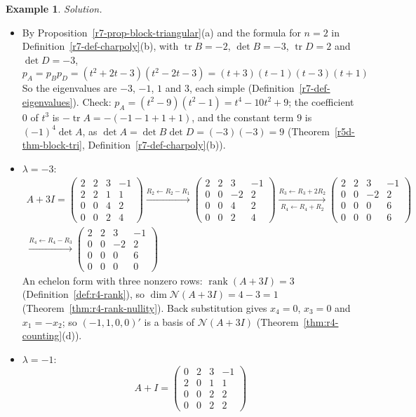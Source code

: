 \documentclass[12pt]{article}
\DeclareMathOperator{\tr}{tr}
\DeclareMathOperator{\rank}{rank}
\theoremstyle{definition}
\newtheorem{example}[theorem]{Example}
\begin{document}
\begin{example}
\textit{Solution.}
\begin{itemize}
\item By Proposition~\ref{r7-prop-block-triangular}(a) and the formula for \(n=2\) in
Definition~\ref{r7-def-charpoly}(b), with \(\tr B=-2\), \(\det B=-3\), \(\tr D=2\) and \(\det D=-3\),
\[
p_A=p_Bp_D=(t^2+2t-3)(t^2-2t-3)=(t+3)(t-1)(t-3)(t+1)
\]
So the eigenvalues are \(-3\), \(-1\), \(1\) and \(3\), each simple (Definition~\ref{r7-def-eigenvalues}). Check:
\(p_A=(t^2-9)(t^2-1)=t^4-10t^2+9\); the coefficient \(0\) of \(t^3\) is \(-\tr A=-(-1-1+1+1)\), and the constant term
\(9\) is \((-1)^4\det A\), as \(\det A=\det B\det D=(-3)(-3)=9\) (Theorem~\ref{r5d-thm-block-tri},
Definition~\ref{r7-def-charpoly}(b)).
\item \(\lambda=-3\):
\[
\begin{gathered}
A+3I=\begin{pmatrix}2&2&3&-1\\2&2&1&1\\0&0&4&2\\0&0&2&4\end{pmatrix}
\xrightarrow{R_2\leftarrow R_2-R_1}
\begin{pmatrix}2&2&3&-1\\0&0&-2&2\\0&0&4&2\\0&0&2&4\end{pmatrix}
\xrightarrow[R_4\leftarrow R_4+R_2]{R_3\leftarrow R_3+2R_2}
\begin{pmatrix}2&2&3&-1\\0&0&-2&2\\0&0&0&6\\0&0&0&6\end{pmatrix}
\\
\xrightarrow{R_4\leftarrow R_4-R_3}
\begin{pmatrix}2&2&3&-1\\0&0&-2&2\\0&0&0&6\\0&0&0&0\end{pmatrix}
\end{gathered}
\]
An echelon form with three nonzero rows: \(\rank(A+3I)=3\) (Definition~\ref{def:r4-rank}), so
\(\dim\mathcal N(A+3I)=4-3=1\) (Theorem~\ref{thm:r4-rank-nullity}). Back substitution gives \(x_4=0\), \(x_3=0\) and
\(x_1=-x_2\); so \((-1,1,0,0)'\) is a basis of \(\mathcal N(A+3I)\) (Theorem~\ref{thm:r4-counting}(d)).
\item \(\lambda=-1\):
\[
A+I=\begin{pmatrix}0&2&3&-1\\2&0&1&1\\0&0&2&2\\0&0&2&2\end{pmatrix}
\]
\end{itemize}
\end{example}
\end{document}
